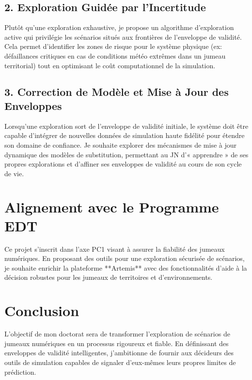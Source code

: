 \documentclass[11pt,a4paper]{article}
\begin{document}
\subsection{2. Exploration Guidée par l'Incertitude}
Plutôt qu'une exploration exhaustive, je propose un algorithme d'exploration active qui privilégie les scénarios situés aux frontières de l'enveloppe de validité. Cela permet d'identifier les zones de risque pour le système physique (ex: défaillances critiques en cas de conditions météo extrêmes dans un jumeau territorial) tout en optimisant le coût computationnel de la simulation.

\subsection{3. Correction de Modèle et Mise à Jour des Enveloppes}
Lorsqu'une exploration sort de l'enveloppe de validité initiale, le système doit être capable d'intégrer de nouvelles données de simulation haute fidélité pour étendre son domaine de confiance. Je souhaite explorer des mécanismes de mise à jour dynamique des modèles de substitution, permettant au JN d'« apprendre » de ses propres explorations et d'affiner ses enveloppes de validité au cours de son cycle de vie.

\section{Alignement avec le Programme EDT}
Ce projet s'inscrit dans l'axe PC1 visant à assurer la fiabilité des jumeaux numériques. En proposant des outils pour une exploration sécurisée de scénarios, je souhaite enrichir la plateforme **Artemis** avec des fonctionnalités d'aide à la décision robustes pour les jumeaux de territoires et d'environnements.

\section{Conclusion}
L'objectif de mon doctorat sera de transformer l'exploration de scénarios de jumeaux numériques en un processus rigoureux et fiable. En définissant des enveloppes de validité intelligentes, j'ambitionne de fournir aux décideurs des outils de simulation capables de signaler d'eux-mêmes leurs propres limites de prédiction.
\end{document}
